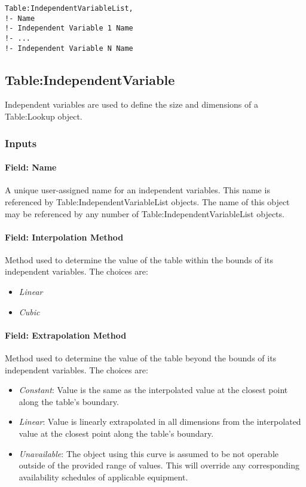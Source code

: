 \begin{verbatim}
Table:IndependentVariableList,
!- Name
!- Independent Variable 1 Name
!- ...
!- Independent Variable N Name
\end{verbatim}

\subsection{Table:IndependentVariable}\label{tableindependentvariable}

Independent variables are used to define the size and dimensions of a
Table:Lookup object.

\subsubsection{Inputs}\label{inputs-2}

\paragraph{Field: Name}\label{field-name-2}

A unique user-assigned name for an independent variables. This name is
referenced by Table:IndependentVariableList objects. The name of this
object may be referenced by any number of Table:IndependentVariableList
objects.

\paragraph{Field: Interpolation
Method}\label{field-interpolation-method}

Method used to determine the value of the table within the bounds of its
independent variables. The choices are:

\begin{itemize}
\tightlist
\item
\emph{Linear}
\item
\emph{Cubic}
\end{itemize}

\paragraph{Field: Extrapolation
Method}\label{field-extrapolation-method}

Method used to determine the value of the table beyond the bounds of its
independent variables. The choices are:

\begin{itemize}
\tightlist
\item
\emph{Constant}: Value is the same as the interpolated value at the
closest point along the table's boundary.
\item
\emph{Linear}: Value is linearly extrapolated in all dimensions from
the interpolated value at the closest point along the table's
boundary.
\item
\emph{Unavailable}: The object using this curve is assumed to be not
operable outside of the provided range of values. This will override
any corresponding availability schedules of applicable equipment.
\end{itemize}

